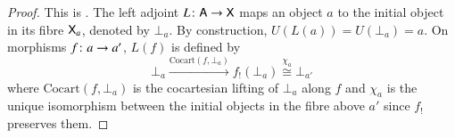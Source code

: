 \documentclass[reqno]{amsart}
\begin{document}
\begin{proof}
 This is \cite[Proposition~4.4]{Gray}. The left adjoint $L\colon\mathsf{A}\to\mathsf{X}$ maps an object $a$ to the initial object in its fibre $\mathsf{X}_a$, denoted by $\bot_a$. By construction, $U(L(a))=U(\bot_a)=a$. On morphisms $f\colon a\to a'$, $L(f)$ is defined by
 \begin{equation}\label{eq:Lonarrows}
  \bot_a\xrightarrow{\mathrm{Cocart}(f,\bot_a)}f_!(\bot_a)\stackrel{\chi_a}{\cong}\bot_{a'}
 \end{equation}
where $\mathrm{Cocart}(f,\bot_a)$ is the cocartesian lifting of $\bot_a$ along $f$ and $\chi_a$ is the unique isomorphism between the initial objects in the fibre above $a'$ since $f_!$ preserves them.
\end{proof}




\end{document}
